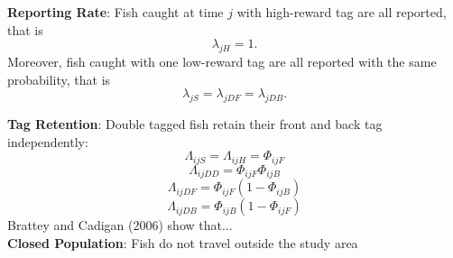\documentclass[paperwidth=58in,paperheight=47in,portrait]{baposter}
\begin{document}
\begin{poster}
{\textbf{Reporting Rate}:
Fish caught at time $j$ with high-reward tag are all reported, that is
\begin{equation}
\lambda_{jH} = 1.
\end{equation}
Moreover, fish caught with one low-reward tag are all reported with the same probability, that is
\begin{equation}
\lambda_{jS} = \lambda_{jDF} =\lambda_{jDB}.
\end{equation}

\textbf{Tag Retention}: Double tagged fish retain their front and back tag independently:
\begin{equation}
\Lambda_{ijS} = \Lambda_{ijH} = \Phi_{ijF}
\end{equation}
\begin{equation}
\Lambda_{ijDD} = \Phi_{ijF} \Phi_{ijB}
\end{equation}
\begin{equation}
\Lambda_{ijDF} = \Phi_{ijF} (1-\Phi_{ijB})
\end{equation}
\begin{equation}
\Lambda_{ijDB} = \Phi_{ijB} (1-\Phi_{ijF})
\end{equation}
Brattey and Cadigan (2006) \cite{BC} show that...\\

\textbf{Closed Population}: Fish do not travel outside the study area \\

}



\end{poster}
\end{document}
